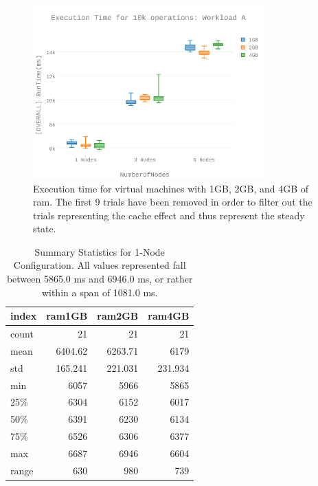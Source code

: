 \begin{figure}[h]
\includegraphics[width=3.5in]{Figures/figures-wlc_fig4.pdf}

\caption{Execution time for virtual machines with 1GB, 2GB, and 4GB of \gls{ram}.  The first 9 trials have been removed in order to filter out the trials representing the cache effect and thus represent the steady state.}

\label{fig:figures-wlc_fig4}
\end{figure}
\begin{table}
\begin{tabular}{lrrr}
\toprule
 index &  ram1GB &  ram2GB &  ram4GB \\
\midrule
 count &      21 &      21 &      21 \\
  mean & 6404.62 & 6263.71 &    6179 \\
   std & 165.241 & 221.031 & 231.934 \\
   min &    6057 &    5966 &    5865 \\
   25\% &    6304 &    6152 &    6017 \\
   50\% &    6391 &    6230 &    6134 \\
   75\% &    6526 &    6306 &    6377 \\
   max &    6687 &    6946 &    6604 \\
 range &     630 &     980 &     739 \\
\bottomrule
\end{tabular}
\caption{Summary Statistics for 1-Node Configuration. All values represented fall between 5865.0 ms and 6946.0 ms, or rather within a span of 1081.0 ms.}
\label{table:summary_statistics_for_1_config}
\end{table}
